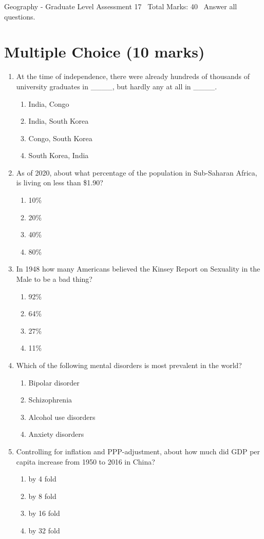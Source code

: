 \documentclass[12pt]{article}
\begin{document}
\begin{center}
Geography - Graduate Level Assessment 17 \
Total Marks: 40 \
Answer all questions.
\end{center}

\section*{Multiple Choice (10 marks)}
\begin{enumerate}[label=\arabic*.]
\item At the time of independence, there were already hundreds of thousands of university graduates in \_\_\_\_, but hardly any at all in \_\_\_\_.
\begin{enumerate}[label=(\alph*)]
    \item India, Congo
    \item India, South Korea
    \item Congo, South Korea
    \item South Korea, India
\end{enumerate}
\item As of 2020, about what percentage of the population in Sub-Saharan Africa, is living on less than \$1.90?
\begin{enumerate}[label=(\alph*)]
    \item 10\%
    \item 20\%
    \item 40\%
    \item 80\%
\end{enumerate}
\item In 1948 how many Americans believed the Kinsey Report on Sexuality in the Male to be a bad thing?
\begin{enumerate}[label=(\alph*)]
    \item 92\%
    \item 64\%
    \item 27\%
    \item 11\%
\end{enumerate}
\item Which of the following mental disorders is most prevalent in the world?
\begin{enumerate}[label=(\alph*)]
    \item Bipolar disorder
    \item Schizophrenia
    \item Alcohol use disorders
    \item Anxiety disorders
\end{enumerate}
\item Controlling for inflation and PPP-adjustment, about how much did GDP per capita increase from 1950 to 2016 in China?
\begin{enumerate}[label=(\alph*)]
    \item by 4 fold
    \item by 8 fold
    \item by 16 fold
    \item by 32 fold
\end{enumerate}
\end{enumerate}
\end{document}
